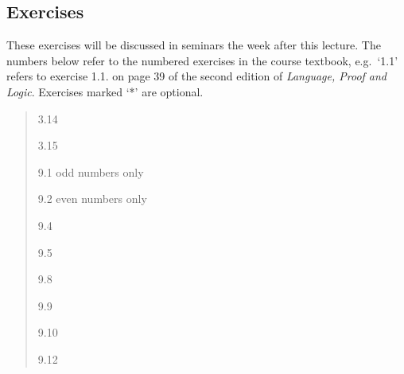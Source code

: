 \documentclass[12pt]{extarticle}
\begin{document}
\begin{multicols*}{3}
\begin{minipage}{\columnwidth}
\section{Exercises}
These exercises will be discussed in seminars the week after this lecture.
The numbers below refer to the numbered exercises in the course textbook, e.g.\ `1.1' refers to exercise 1.1. on page 39 of the second edition of \emph{Language, Proof and Logic}. Exercises marked `*' are optional.
 
\begin{quote}
3.14
 
3.15
 
9.1 odd numbers only
 
9.2 even numbers only
 
9.4
 
9.5
 
9.8
 
9.9
 
9.10
 
9.12
 
\end{quote}
\end{minipage}


 


\end{multicols*}
\end{document}
